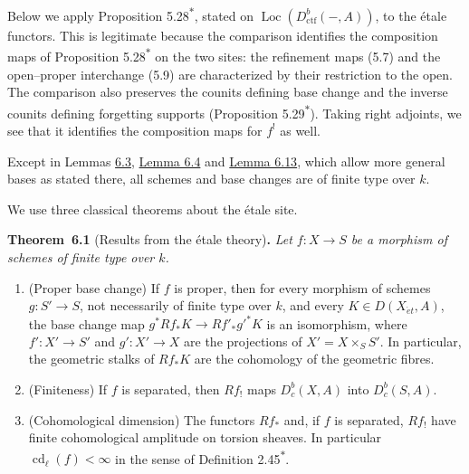 \documentclass[11pt]{article}
\newenvironment{bpstatement}[2]{\par\addvspace{0.6\baselineskip}\noindent\textbf{#1}#2\textbf{.}\enspace\ignorespaces}
  {\par\addvspace{0.4\baselineskip}}
\newenvironment{bpstatementit}[2]{\begin{bpstatement}{#1}{#2}\itshape\ignorespaces}{\end{bpstatement}}
\newcommand{\bpout}[1]{#1\textsuperscript{\hyperlink{bp-outside}{\ensuremath{\ast}}}}
\providecommand{\Dbc}{}\renewcommand{\Dbc}{D^b_c}
\providecommand{\Loc}{}\renewcommand{\Loc}{\operatorname{Loc}}
\begin{document}
Below we apply Proposition \bpout{5.28}, stated on \(\Loc(D^b_{\mathrm{ctf}}(-,A))\), to the étale functors. This is legitimate because the comparison identifies the composition maps of Proposition \bpout{5.28} on the two sites: the refinement maps (5.7) and the open–proper interchange (5.9) are characterized by their restriction to the open. The comparison also preserves the counits defining base change and the inverse counits defining forgetting supports (Proposition \bpout{5.29}). Taking right adjoints, we see that it identifies the composition maps for \(f^!\) as well.

Except in Lemmas \hyperref[bp11]{6.3}, \hyperref[bp14]{Lemma 6.4} and \hyperref[bp41]{Lemma 6.13}, which allow more general bases as stated there, all schemes and base changes are of finite type over \(k\).

We use three classical theorems about the étale site.

\label{bp5}%
\begin{bpstatementit}{Theorem~6.1}{ (Results from the étale theory)}
Let \(f:X\to S\) be a morphism of schemes of finite type over \(k\).

\begin{enumerate}
\item (Proper base change) If \(f\) is proper, then for every morphism of schemes \(g:S'\to S\), not necessarily of finite type over \(k\), and every \(K\in D(X_{\acute{e}t},A)\), the base change map \(g^*Rf_*K\to Rf'_*g'^*K\) is an isomorphism, where \(f':X'\to S'\) and \(g':X'\to X\) are the projections of \(X'=X\times_SS'\). In particular, the geometric stalks of \(Rf_*K\) are the cohomology of the geometric fibres.
\item (Finiteness) If \(f\) is separated, then \(Rf_!\) maps \(\Dbc(X,A)\) into \(\Dbc(S,A)\).
\item (Cohomological dimension) The functors \(Rf_*\) and, if \(f\) is separated, \(Rf_!\) have finite cohomological amplitude on torsion sheaves. In particular \(\operatorname{cd}_\ell(f)<\infty\) in the sense of Definition \bpout{2.45}.
\end{enumerate}
\end{bpstatementit}
\end{document}
